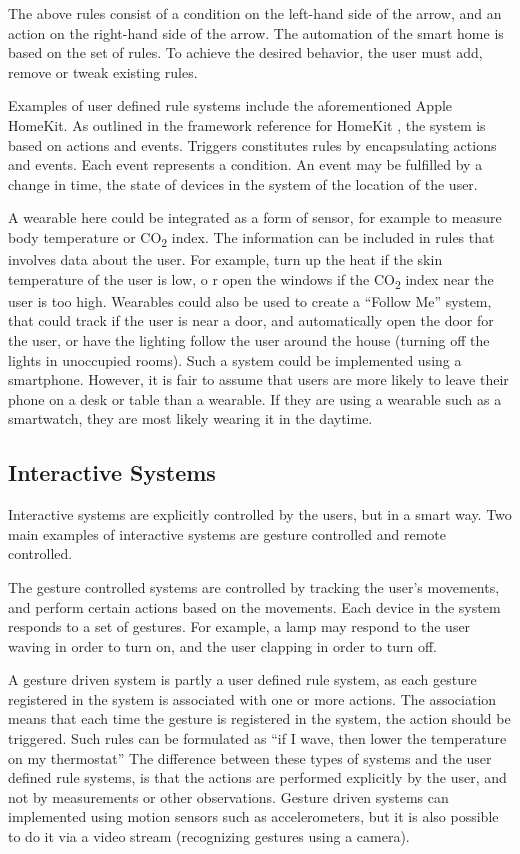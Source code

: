 The above rules consist of a condition on the left-hand side of the arrow, 
and an action on the right-hand side of the arrow.
The automation of the smart home is based on the set of rules. 
To achieve the desired behavior, the user must add, remove or tweak existing rules.

Examples of user defined rule systems include the aforementioned Apple HomeKit. 
As outlined in the framework reference for HomeKit \cite{applehomekitref}, 
the system is based on actions and events. 
Triggers constitutes rules by encapsulating actions and events. 
Each event represents a condition. 
An event may be fulfilled by a change in time, 
the state of devices in the system of the location of the user.

A wearable here could be integrated as a form of sensor, for example to measure body temperature or CO\textsubscript{2} index.
The information can be included in rules that involves data about the user. 
For example, turn up the heat if the skin temperature of the user is low, o
r open the windows if the CO\textsubscript{2} index near the user is too high.
Wearables could also be used to create a ``Follow Me'' system, 
that could track if the user is near \eg a door, 
and automatically open the door for the user, 
or have the lighting follow the user around the house (turning off the lights in unoccupied rooms). 
Such a system could be implemented using a smartphone. 
However, it is fair to assume that users are more likely to leave their phone on a desk or table than a wearable. 
If they are using a wearable such as a smartwatch, 
they are most likely wearing it in the daytime.


\subsection{Interactive Systems}

Interactive systems are explicitly controlled by the users, but in a smart way. 
Two main examples of interactive systems are gesture controlled and remote controlled. 

The gesture controlled systems are controlled by tracking the user's movements, 
and perform certain actions based on the movements.
Each device in the system responds to a set of gestures. 
For example, a lamp may respond to the user waving in order to turn on, 
and the user clapping in order to turn off.

A gesture driven system is partly a user defined rule system, 
as each gesture registered in the system is associated with one or more actions.
The association means that each time the gesture is registered in the system, the action should be triggered. 
Such rules can be formulated as ``if I wave, then lower the temperature on my thermostat''
The difference between these types of systems and the user defined rule systems, 
is that the actions are performed explicitly by the user, 
and not by measurements or other observations.
Gesture driven systems can implemented using motion sensors such as accelerometers, 
but it is also possible to do it via a video stream (recognizing gestures using a camera). 

